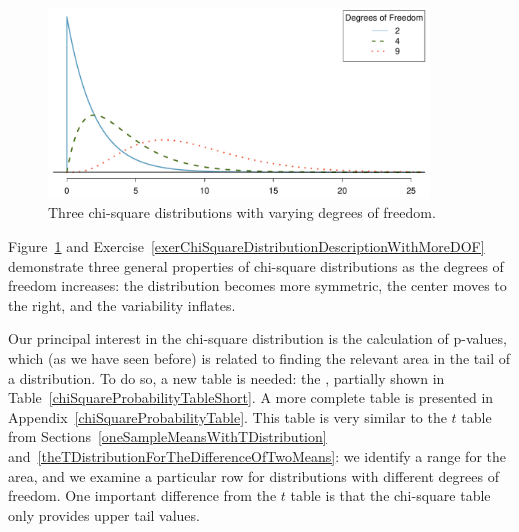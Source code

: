 \begin{figure}[h]
\centering
\includegraphics[width=0.9\textwidth]{ch_inference_for_props/figures/chiSquareDistributionWithInceasingDF/chiSquareDistributionWithInceasingDF}
\caption{Three chi-square distributions with varying degrees of freedom.}
\label{chiSquareDistributionWithInceasingDF}
\end{figure}

Figure~\ref{chiSquareDistributionWithInceasingDF} and Exercise~\ref{exerChiSquareDistributionDescriptionWithMoreDOF} demonstrate three general properties of chi-square distributions as the degrees of freedom increases: the distribution becomes more symmetric, the center moves to the right, and the variability inflates.

Our principal interest in the chi-square distribution is the calculation of p-values, which (as we have seen before) is related to finding the relevant area in the tail of a distribution. To do so, a new table is needed: the , partially shown in Table~\ref{chiSquareProbabilityTableShort}. A more complete table is presented in Appendix~\vref{chiSquareProbabilityTable}. This table is very similar to the $t$ table from Sections~\ref{oneSampleMeansWithTDistribution} and~\ref{theTDistributionForTheDifferenceOfTwoMeans}: we identify a range for the area, and we examine a particular row for distributions with different degrees of freedom. One important difference from the $t$ table is that the chi-square table only provides upper tail values.

